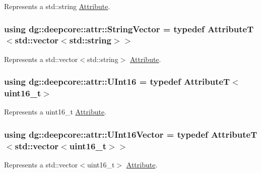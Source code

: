 Represents a {\ttfamily std\+::string} \hyperlink{classdg_1_1deepcore_1_1_attribute}{Attribute}. 

\subsubsection[{\texorpdfstring{String\+Vector}{StringVector}}]{\setlength{\rightskip}{0pt plus 5cm}using {\bf dg\+::deepcore\+::attr\+::\+String\+Vector} = typedef AttributeT$<$std\+::vector$<$std\+::string$>$$>$}\hypertarget{group___process_attributes_gad54faaab3e92e81d2736c59cdef478a1}{}\label{group___process_attributes_gad54faaab3e92e81d2736c59cdef478a1}


Represents a {\ttfamily std\+::vector$<$std\+::string$>$} \hyperlink{classdg_1_1deepcore_1_1_attribute}{Attribute}. 

\subsubsection[{\texorpdfstring{U\+Int16}{UInt16}}]{\setlength{\rightskip}{0pt plus 5cm}using {\bf dg\+::deepcore\+::attr\+::\+U\+Int16} = typedef AttributeT$<$uint16\+\_\+t$>$}\hypertarget{group___process_attributes_ga1d4f77318c9b5cbb83ca3a9983c58829}{}\label{group___process_attributes_ga1d4f77318c9b5cbb83ca3a9983c58829}


Represents a {\ttfamily uint16\+\_\+t} \hyperlink{classdg_1_1deepcore_1_1_attribute}{Attribute}. 

\subsubsection[{\texorpdfstring{U\+Int16\+Vector}{UInt16Vector}}]{\setlength{\rightskip}{0pt plus 5cm}using {\bf dg\+::deepcore\+::attr\+::\+U\+Int16\+Vector} = typedef AttributeT$<$std\+::vector$<$uint16\+\_\+t$>$$>$}\hypertarget{group___process_attributes_ga5abb768947991d80908ad772dd82ee2c}{}\label{group___process_attributes_ga5abb768947991d80908ad772dd82ee2c}


Represents a {\ttfamily std\+::vector$<$uint16\+\_\+t$>$} \hyperlink{classdg_1_1deepcore_1_1_attribute}{Attribute}. 

